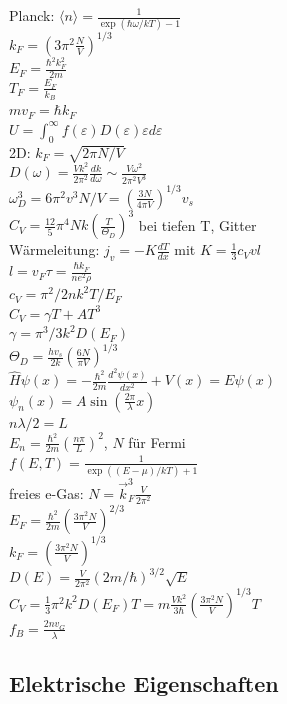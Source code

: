 \documentclass[12pt,a4paper]{article}
\renewcommand{\d}[2]{\frac{d #1}{d #2}}
\newcommand{\dd}[2]{\frac{d^2 #1}{d #2^2}}
\renewcommand{\=}[1]{\stackrel{#1}{=}}
\theoremstyle{definition}
\theoremstyle{remark}
\begin{document}
Planck: $\langle n \rangle = \frac{1}{\exp(\hbar \omega / kT)-1}$\\
$k_F = (3\pi^2 \frac{N}{V})^{1/3}$\\
$E_F = \frac{\hbar^2 k_F^2}{2m}$\\
$T_F = \frac{E_F}{k_B}$\\
$m v_F = \hbar k_F$\\
$U = \int_0^{\infty} f(\varepsilon) D(\varepsilon) \varepsilon d\varepsilon $\\
2D: $k_F = \sqrt{2\pi N/V}$\\
$D(\omega) = \frac{Vk^2}{2\pi^2} \d{k}{\omega} \sim \frac{V \omega^2}{2\pi^2 V^3}$\\
$\omega_D^3 = 6\pi^2 v^3 N/V = (\frac{3N}{4\pi V})^{1/3} v_s$\\
$C_V = \frac{12}{5} \pi^4 N k (\frac{T}{\Theta_D})^3$ bei tiefen T, Gitter\\
Wärmeleitung: $j _v = - K \d{T}{x}$ mit $K = \frac{1}{3} c_V v l$\\
$l = v_F \tau = \frac{\hbar k_F}{n e^2 \rho}$\\
$c_V = \pi^2 / 2 n k^2 T/E_F$\\
$C_V = \gamma T + A T^3$\\
$\gamma = \pi^3 / 3 k^2 D(E_F)$\\
$\Theta_D = \frac{h v_s}{2k} (\frac{6N}{\pi V})^{1/3}$\\
$\hat H \psi(x) = - \frac{\hbar^2}{2m} \dd{\psi(x)}{x} + V(x) = E \psi(x)$\\
$\psi_n (x) = A \sin (\frac{2\pi}{\lambda} x)$\\
$n \lambda/2 = L$\\
$E_n = \frac{\hbar^2}{2m} (\frac{n\pi}{L})^2$, $N$ für Fermi\\
$f(E, T) = \frac{1}{\exp ((E-\mu)/kT) +1}$\\
freies e-Gas: $N = \vec k_F^3  \frac{V}{2\pi^2}$\\
$E_F = \frac{\hbar^2}{2m} (\frac{3\pi^2 N}{V})^{2/3}$\\
$k_F = (\frac{3\pi^2 N}{V})^{1/3}$\\
$D(E) = \frac{V}{2\pi^2} (2m/ \hbar)^{3/2} \sqrt{E}$\\
$C_V = \frac{1}{3} \pi^2 k^2 D(E_F) T = m \frac{V k^2}{3 \hbar} (\frac{3\pi^2 N}{V})^{1/3} T$\\
$f_B = \frac{2n v_G}{\lambda}$

\subsection{Elektrische Eigenschaften}
\end{document}
